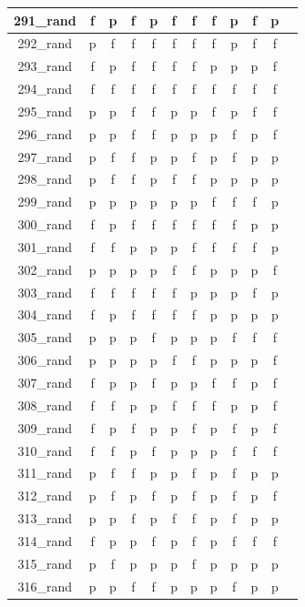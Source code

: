 \documentclass[
fancyheadings, %
%
%
]{stsreprt}
\begin{document}
\begin{longtable}{|c|c|c|c|c|c|c|c|c|c|c|c|}
\hline
291\_rand & f & p & f & p & f & f & f & p & f & p \\
\hline
292\_rand & p & f & f & f & f & f & f & p & f & f \\
\hline
293\_rand & f & p & f & f & f & f & p & p & p & f \\
\hline
294\_rand  & f & f & f & f & f & f & f & f & f & f \\
\hline
295\_rand & p & p & f & f & p & p & f & p & f & f \\
\hline
296\_rand & p & p & f & f & p & p & p & f & p & f \\
\hline
297\_rand & p & f & f & p & p & f & p & f & p & p \\
\hline
298\_rand & p & f & f & p & f & f & p & p & p & p \\
\hline
299\_rand & p & p & p & p & p & p & f & f & f & p \\
\hline
300\_rand & f & p & f & f & f & f & f & f & p & p \\
\hline
301\_rand & f & f & p & p & p & f & f & f & f & p \\
\hline
302\_rand & p & p & p & p & f & f & p & p & p & f \\
\hline
303\_rand & f & f & f & f & f & p & p & p & f & p \\
\hline
304\_rand & f & p & f & f & f & f & p & p & p & p \\
\hline
305\_rand & p & p & p & f & p & p & p & f & f & f \\
\hline
306\_rand & p & p & p & p & f & f & p & p & p & f \\
\hline
307\_rand & f & p & p & f & p & p & f & f & p & f \\
\hline
308\_rand & f & f & p & p & f & f & f & p & p & f \\
\hline
309\_rand & f & p & f & p & p & f & p & f & p & f \\
\hline
310\_rand & f & f & p & f & p & p & p & f & f & f \\
\hline
311\_rand & p & f & f & p & p & f & p & f & p & p \\
\hline
312\_rand & p & f & p & f & p & f & p & f & p & f \\
\hline
313\_rand & p & p & f & p & f & f & p & f & p & p \\
\hline
314\_rand & f & p & p & f & p & f & p & f & f & f \\
\hline
315\_rand & p & f & p & p & p & f & p & p & p & p \\
\hline
316\_rand & p & p & f & f & p & p & p & f & p & p \\

\end{longtable}
\end{document}
